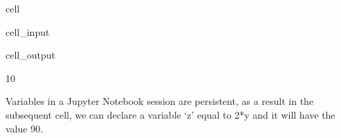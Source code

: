 \documentclass[letterpaper,10pt,english]{jupyterBook}
\begin{document}
\begin{sphinxuseclass}{cell}\begin{sphinxVerbatimInput}

\begin{sphinxuseclass}{cell_input}
\begin{sphinxVerbatim}[commandchars=\\\{\}]
  
\end{sphinxVerbatim}

\end{sphinxuseclass}\end{sphinxVerbatimInput}
\begin{sphinxVerbatimOutput}

\begin{sphinxuseclass}{cell_output}
\begin{sphinxVerbatim}[commandchars=\\\{\}]
10
\end{sphinxVerbatim}

\end{sphinxuseclass}\end{sphinxVerbatimOutput}

\end{sphinxuseclass}
\sphinxAtStartPar
Variables in a Jupyter Notebook session are persistent, as a result in the subsequent cell, we can declare a variable ‘z’ equal to 2*y and it will have the value 90.
\end{document}
